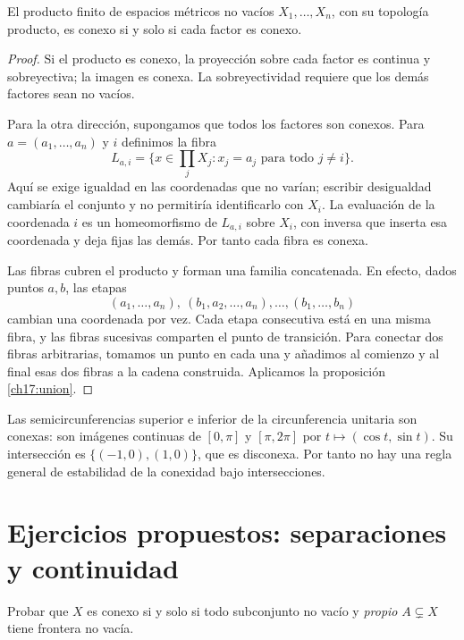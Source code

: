 \begin{teorema}\label{ch17:producto}
El producto finito de espacios métricos no vacíos $X_1,\ldots,X_n$, con su topología producto, es conexo si y solo si cada factor es conexo.
\end{teorema}
\begin{proof}
Si el producto es conexo, la proyección sobre cada factor es continua y sobreyectiva; la imagen es conexa. La sobreyectividad requiere que los demás factores sean no vacíos.

Para la otra dirección, supongamos que todos los factores son conexos. Para $a=(a_1,\ldots,a_n)$ y $i$ definimos la fibra
\[
L_{a,i}=\{x\in\textstyle\prod_jX_j:x_j=a_j\text{ para todo }j\ne i\}.
\]
Aquí se exige igualdad en las coordenadas que no varían; escribir desigualdad cambiaría el conjunto y no permitiría identificarlo con $X_i$. La evaluación de la coordenada $i$ es un homeomorfismo de $L_{a,i}$ sobre $X_i$, con inversa que inserta esa coordenada y deja fijas las demás. Por tanto cada fibra es conexa.

Las fibras cubren el producto y forman una familia concatenada. En efecto, dados puntos $a,b$, las etapas
\[
(a_1,\ldots,a_n),\ (b_1,a_2,\ldots,a_n),\ldots,(b_1,\ldots,b_n)
\]
cambian una coordenada por vez. Cada etapa consecutiva está en una misma fibra, y las fibras sucesivas comparten el punto de transición. Para conectar dos fibras arbitrarias, tomamos un punto en cada una y añadimos al comienzo y al final esas dos fibras a la cadena construida. Aplicamos la proposición \ref{ch17:union}.
\end{proof}

\begin{ejemplo}
Las semicircunferencias superior e inferior de la circunferencia unitaria son conexas: son imágenes continuas de $[0,\pi]$ y $[\pi,2\pi]$ por $t\mapsto(\cos t,\sin t)$. Su intersección es $\{(-1,0),(1,0)\}$, que es disconexa. Por tanto no hay una regla general de estabilidad de la conexidad bajo intersecciones.
\end{ejemplo}

\section{Ejercicios propuestos: separaciones y continuidad}
\begin{ejercicio}\label{ej:lectura-17-1}
Probar que $X$ es conexo si y solo si todo subconjunto no vacío y \emph{propio} $A\subsetneq X$ tiene frontera no vacía.
\end{ejercicio}


